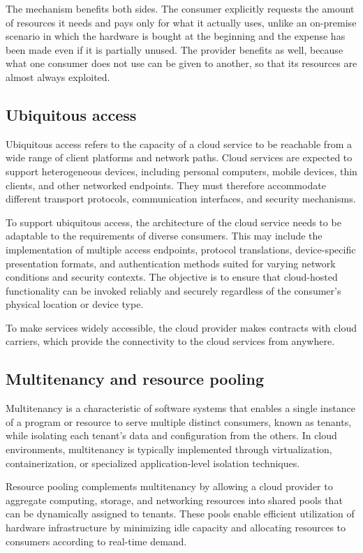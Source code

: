 The mechanism benefits both sides. The consumer explicitly requests the amount of resources it needs and pays only for what it actually uses, unlike an on-premise scenario in which the hardware is bought at the beginning and the expense has been made even if it is partially unused. The provider benefits as well, because what one consumer does not use can be given to another, so that its resources are almost always exploited.

\subsection{Ubiquitous access}

Ubiquitous access refers to the capacity of a cloud service to be reachable from a wide range of client platforms and network paths. Cloud services are expected to support heterogeneous devices, including personal computers, mobile devices, thin clients, and other networked endpoints. They must therefore accommodate different transport protocols, communication interfaces, and security mechanisms.

To support ubiquitous access, the architecture of the cloud service needs to be adaptable to the requirements of diverse consumers. This may include the implementation of multiple access endpoints, protocol translations, device-specific presentation formats, and authentication methods suited for varying network conditions and security contexts. The objective is to ensure that cloud-hosted functionality can be invoked reliably and securely regardless of the consumer's physical location or device type.

To make services widely accessible, the cloud provider makes contracts with cloud carriers, which provide the connectivity to the cloud services from anywhere.


\subsection{Multitenancy and resource pooling}

Multitenancy is a characteristic of software systems that enables a single instance of a program or resource to serve multiple distinct consumers, known as tenants, while isolating each tenant's data and configuration from the others. In cloud environments, multitenancy is typically implemented through virtualization, containerization, or specialized application-level isolation techniques.

Resource pooling complements multitenancy by allowing a cloud provider to aggregate computing, storage, and networking resources into shared pools that can be dynamically assigned to tenants. These pools enable efficient utilization of hardware infrastructure by minimizing idle capacity and allocating resources to consumers according to real-time demand.

